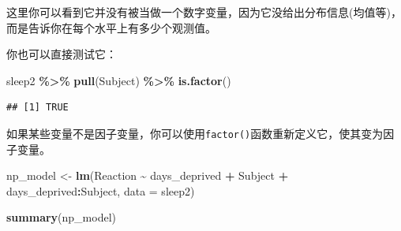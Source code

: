 \documentclass[
]{book}
\newenvironment{Shaded}{\begin{snugshade}}{\end{snugshade}}
\newcommand{\AttributeTok}[1]{\textcolor[rgb]{0.13,0.29,0.53}{#1}}
\newcommand{\FunctionTok}[1]{\textcolor[rgb]{0.13,0.29,0.53}{\textbf{#1}}}
\newcommand{\NormalTok}[1]{#1}
\newcommand{\OtherTok}[1]{\textcolor[rgb]{0.56,0.35,0.01}{#1}}
\newcommand{\SpecialCharTok}[1]{\textcolor[rgb]{0.81,0.36,0.00}{\textbf{#1}}}
\begin{document}
这里你可以看到它并没有被当做一个数字变量，因为它没给出分布信息(均值等)，而是告诉你在每个水平上有多少个观测值。

你也可以直接测试它：

\begin{Shaded}
\begin{Highlighting}[]
\NormalTok{sleep2 }\SpecialCharTok{\%\textgreater{}\%} \FunctionTok{pull}\NormalTok{(Subject) }\SpecialCharTok{\%\textgreater{}\%} \FunctionTok{is.factor}\NormalTok{()}
\end{Highlighting}
\end{Shaded}

\begin{verbatim}
## [1] TRUE
\end{verbatim}

如果某些变量不是因子变量，你可以使用\texttt{factor()}函数重新定义它，使其变为因子变量。

\begin{Shaded}
\begin{Highlighting}[]
\NormalTok{np\_model }\OtherTok{\textless{}{-}} \FunctionTok{lm}\NormalTok{(Reaction }\SpecialCharTok{\textasciitilde{}}\NormalTok{ days\_deprived }\SpecialCharTok{+}\NormalTok{ Subject }\SpecialCharTok{+}\NormalTok{ days\_deprived}\SpecialCharTok{:}\NormalTok{Subject,}
               \AttributeTok{data =}\NormalTok{ sleep2)}

\FunctionTok{summary}\NormalTok{(np\_model)}
\end{Highlighting}
\end{Shaded}
\end{document}
